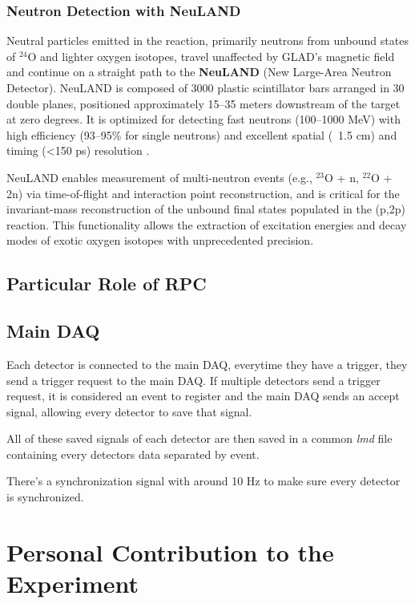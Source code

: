 \subsubsection{Neutron Detection with NeuLAND}

Neutral particles emitted in the reaction, primarily neutrons from unbound states of $^{24}$O and lighter oxygen isotopes, travel unaffected by GLAD’s magnetic field and continue on a straight path to the \textbf{NeuLAND} (New Large-Area Neutron Detector). NeuLAND is composed of 3000 plastic scintillator bars arranged in 30 double planes, positioned approximately 15–35 meters downstream of the target at zero degrees. It is optimized for detecting fast neutrons (100–1000 MeV) with high efficiency (93–95\% for single neutrons) and excellent spatial (~1.5 cm) and timing (<150 ps) resolution \cite{boretzky_neuland_2021}.

NeuLAND enables measurement of multi-neutron events (e.g., $^{23}$O + n, $^{22}$O + 2n) via time-of-flight and interaction point reconstruction, and is critical for the invariant-mass reconstruction of the unbound final states populated in the (p,2p) reaction. This functionality allows the extraction of excitation energies and decay modes of exotic oxygen isotopes with unprecedented precision.


\subsection{Particular Role of RPC}

\cite{xarepe_resistive_2023}


\subsection{Main DAQ}

Each detector is connected to the main \gls{DAQ}, everytime they have a trigger, they send a trigger request to the main \gls{DAQ}. If multiple detectors send a trigger request, it is considered an event to register and the main \gls{DAQ} sends an accept signal, allowing every detector to save that signal.

All of these saved signals of each detector are then saved in a common \textit{lmd} file containing every detectors data separated by event.

There's a synchronization signal with around 10 Hz to make sure every detector is synchronized.


\section{Personal Contribution to the Experiment}